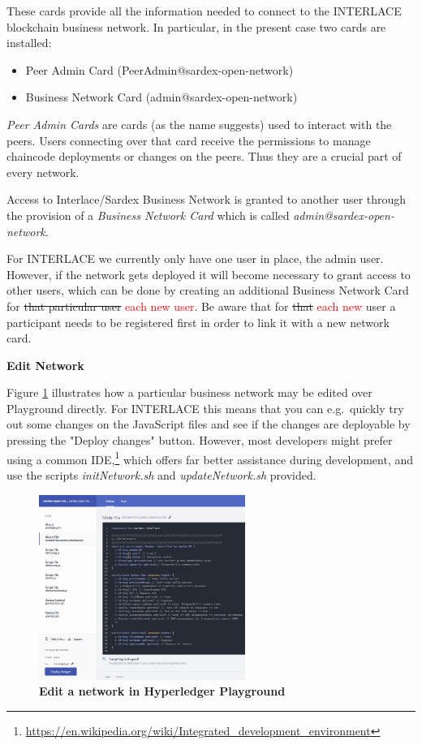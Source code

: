 These cards provide all the information needed to connect to the INTERLACE blockchain business network. In particular, in the present case two cards are installed:

\begin{itemize}
	\item Peer Admin Card (PeerAdmin@sardex-open-network)
	\item Business Network Card (admin@sardex-open-network)
\end{itemize}

\textit{Peer Admin Cards} are cards (as the name suggests) used to interact with the peers. Users connecting over that card receive the permissions to manage chaincode deployments or changes on the peers. Thus they are a crucial part of every network.

Access to Interlace/Sardex Business Network is granted to another user through the provision of a \textit{Business Network Card} which is called \textit{admin@sardex-open-network}.

For INTERLACE we currently only have one user in place, the admin user. However, if the network gets deployed it will become necessary to grant access to other users, which can be done by creating an additional Business Network Card for \st{that particular user} \textcolor{red}{each new user}. Be aware that for \st{that} \textcolor{red}{each new} user a participant needs to be registered first in order to link it with a new network card.

\textbf{Edit Network}

Figure \ref{fig:edit-network} illustrates how a particular business network may be edited over Playground directly. For INTERLACE this means that you can e.g.\ quickly try out some changes on the JavaScript files and see if the changes are deployable by pressing the "Deploy changes" button. However, most developers might prefer using a common IDE,\footnote{\url{https://en.wikipedia.org/wiki/Integrated_development_environment}} which offers far better assistance during development, and use the scripts \textit{initNetwork.sh} and \textit{updateNetwork.sh} provided.

\begin{figure}[htbp]
  \centering
  \includegraphics[width=0.6\textwidth]{Figures/edit-network}
  \caption{\bf\small Edit a network in Hyperledger Playground}
  \label{fig:edit-network}
\end{figure}

